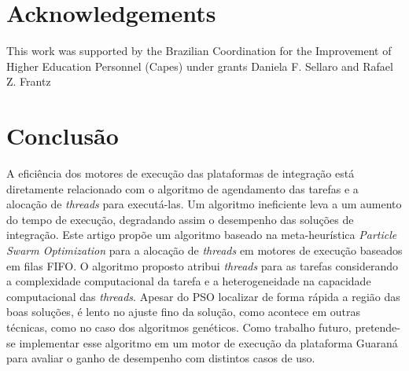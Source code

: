 \documentclass[sigconf]{acmart}
\begin{document}
\section{Acknowledgements}
\label{sec:Agradecimentos}
This work was supported by the Brazilian Coordination for the Improvement of Higher Education Personnel (Capes) under grants Daniela F. Sellaro and Rafael Z. Frantz
 \section{Conclus\~{a}o}
 \label{sec:conclusao}
 A eficiência dos motores de execução das plataformas de integração está diretamente relacionado com o algoritmo de agendamento das tarefas e a alocação de \emph{threads} para executá-las. Um algoritmo ineficiente leva a um aumento do tempo de execução, degradando assim o desempenho das soluções de integração. Este artigo propõe um algoritmo baseado na meta-heurística \textit{Particle Swarm Optimization} para a alocação de \emph{threads} em motores de execução baseados em filas FIFO. O algoritmo proposto atribui \emph{threads} para as tarefas considerando a complexidade computacional da tarefa e a heterogeneidade na capacidade computacional das \emph{threads}. 
 Apesar do PSO localizar de forma rápida a região das boas soluções, é lento no ajuste fino da solução, como acontece em outras técnicas, como no caso dos algoritmos genéticos.  Como trabalho futuro, pretende-se implementar esse algoritmo em um motor de execução da plataforma Guaraná para avaliar o ganho de desempenho com distintos casos de uso.	

 	
 	\begin{small}
 		
 		
 	\end{small}
 	
 
\end{document}
